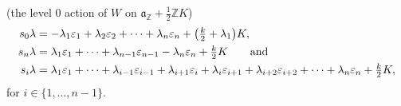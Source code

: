 \documentclass[11pt]{article}
\theoremstyle{plain}
\theoremstyle{definition}
\theoremstyle{remark}
\numberwithin{equation}{section}
\def\ZZ{\mathbb{Z}}
\def\fa{\mathfrak{a}}
\newcounter{r}
\newcounter{s}
\begin{document}
(the level 0 action of $W$ on $\fa_\ZZ+\frac12\ZZ K$)
\begin{align}
s_0 \lambda
&=  
-\lambda_1\varepsilon_1+\lambda_2\varepsilon_2+\cdots+\lambda_n\varepsilon_n
+\big(\hbox{$\frac{k}{2}$} + \lambda_1\big)K,
\nonumber \\
s_n\lambda
&=  \lambda_1\varepsilon_1+\cdots+\lambda_{n-1}\varepsilon_{n-1}
-\lambda_n\varepsilon_n +\hbox{$\frac{k}{2}$}K
\qquad\hbox{and}
\label{WveeactionI} 
\\
s_i\lambda
&=  \lambda_1\varepsilon_1 +\cdots
+\lambda_{i-1}\varepsilon_{i-1} +\lambda_{i+1}\varepsilon_i 
+\lambda_i\varepsilon_{i+1}
+\lambda_{i+2}\varepsilon_{i+2}+\cdots +\lambda_n\varepsilon_n
+\hbox{$\frac{k}{2}$} K,
\nonumber 
\end{align}
for $i\in \{1, \ldots, n-1\}$.
\end{document}
